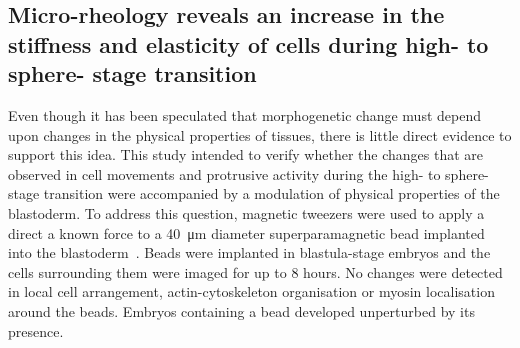 \subsection{Micro-rheology reveals an increase in the stiffness and elasticity of cells during high- to sphere- stage transition}

Even though it has been speculated that morphogenetic change must depend upon changes in the physical properties of tissues, there is little direct evidence to support this idea.
This study intended to verify whether the changes that are observed in cell movements and protrusive activity during the high- to sphere-stage transition were accompanied by a modulation of physical properties of the blastoderm.
To address this question, magnetic tweezers were used to apply a direct a known force to a \SI{40}{\micro\meter} diameter superparamagnetic bead implanted into the blastoderm~\cite{}. %
Beads were implanted in blastula-stage embryos and the cells surrounding them were imaged for up to 8 hours.
No changes were detected in local cell arrangement, actin-cytoskeleton organisation or myosin localisation around the beads.
Embryos containing a bead developed unperturbed by its presence.


